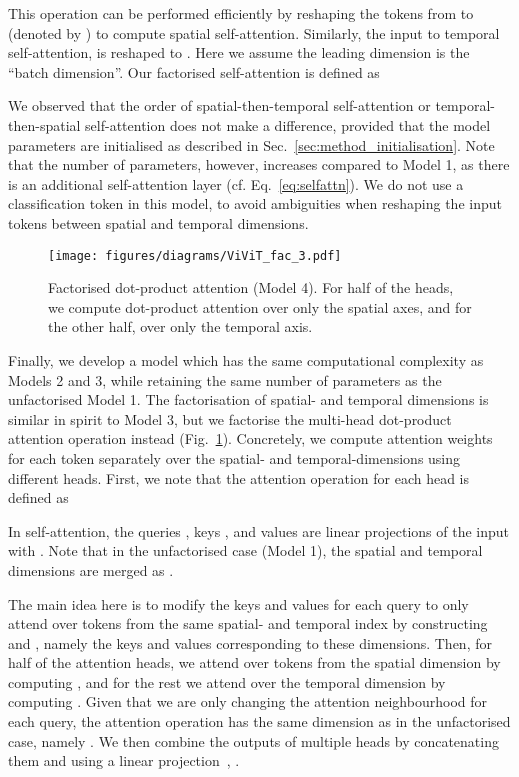 \documentclass[10pt,twocolumn,letterpaper]{article}
\makeatletter
\renewcommand{\paragraph}{\@startsection{paragraph}{4}{\z@}{1.625ex \@plus 1ex \@minus .2ex}{-1em}{\normalfont\normalsize\bfseries}}
\makeatother
\begin{document}
This operation can be performed efficiently by reshaping the tokens  from  to  (denoted by ) to compute spatial self-attention.
Similarly, the input to temporal self-attention,  is reshaped to .
Here we assume the leading dimension is the ``batch dimension''.
Our factorised self-attention is defined as

We observed that the order of spatial-then-temporal self-attention or temporal-then-spatial self-attention does not make a difference, provided that the model parameters are initialised as described in Sec.~\ref{sec:method_initialisation}.
Note that the number of parameters, however, increases compared to Model 1, as there is an additional self-attention layer (cf. Eq.~\ref{eq:selfattn}).
We do not use a classification token in this model, to avoid ambiguities when reshaping the input tokens between spatial and temporal dimensions.

\paragraph{Model 4: Factorised dot-product attention}
\begin{figure}
    \centering
    \texttt{[image: figures/diagrams/ViViT\_fac\_3.pdf]}
    \caption{Factorised dot-product attention (Model 4).
    For half of the heads, we compute dot-product attention over only the spatial axes, and for the other half, over only the temporal axis.
    }
    \label{fig:factorised_dot_product_attention}
    \vspace{-\baselineskip}
\end{figure} Finally, we develop a model which has the same computational complexity as Models 2 and 3, while retaining the same number of parameters as the unfactorised Model 1.
The factorisation of spatial- and temporal dimensions is similar in spirit to Model 3, but we factorise the multi-head dot-product attention operation instead (Fig.~\ref{fig:factorised_dot_product_attention}).
Concretely, we compute attention weights for each token separately over the spatial- and temporal-dimensions using different heads.
First, we note that the attention operation for each head is defined as

In self-attention, the queries , keys , and values  are linear projections of the input  with . 
Note that in the unfactorised case (Model 1), the spatial and temporal dimensions are merged as .

The main idea here is to modify the keys and values for each query to only attend over tokens from the same spatial- and temporal index by constructing  and , namely the keys and values corresponding to these dimensions. Then, for half of the attention heads, we attend over tokens from the spatial dimension by computing , and for the rest we attend over the temporal dimension by computing .
Given that we are only changing the attention neighbourhood for each query, the attention operation has the same dimension as in the unfactorised case, namely . 
We then combine the outputs of multiple heads by concatenating them and using a linear projection~\cite{vaswani_neurips_2017}, 
.
\end{document}
